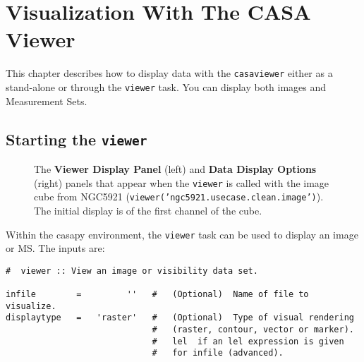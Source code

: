 

\chapter{Visualization With The CASA Viewer}
\label{chapter:display}

This chapter describes how to display data with the {\tt casaviewer}
either as a stand-alone or through the {\tt viewer} task. You can
display both images and Measurement Sets.

\section{Starting the {\tt viewer}}
\label{section:display.start}

\begin{figure}[h!]
\begin{center}
\caption{\label{fig:viewer_start} The {\bf Viewer Display Panel} (left) and 
{\bf Data Display Options} (right) panels that appear when the 
{\tt viewer} is called with the image cube from NGC5921
({\tt viewer('ngc5921.usecase.clean.image')}).  The initial display is
of the first channel of the cube.}
\hrulefill
\end{center}
\end{figure}

Within the casapy environment, the {\tt viewer} task
can be used to display an image or MS.  The inputs are:
\small
\begin{verbatim}
#  viewer :: View an image or visibility data set.

infile        =         ''   #   (Optional)  Name of file to visualize.
displaytype   =   'raster'   #   (Optional)  Type of visual rendering
                             #   (raster, contour, vector or marker).
                             #   lel  if an lel expression is given
                             #   for infile (advanced).

\end{verbatim}
\normalsize

